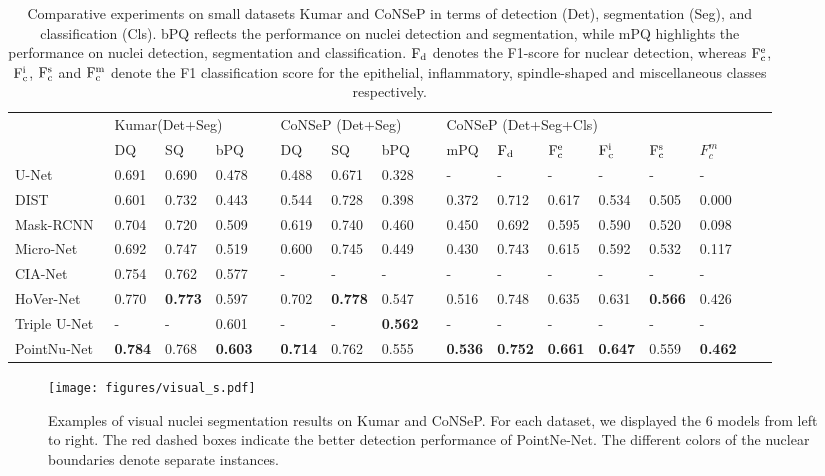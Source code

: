 \documentclass[lettersize,journal]{IEEEtran}
\begin{document}
\begin{table*}[ht]\footnotesize
\centering
\caption{Comparative experiments on small datasets Kumar and CoNSeP in terms of detection (Det), segmentation (Seg), and classification (Cls). bPQ reflects the performance on nuclei detection and segmentation, while mPQ highlights the performance on nuclei detection, segmentation and classification. $\rm{F_d}$ denotes the F1-score for nuclear detection, whereas $\rm{F_c^e}$, $\rm{F_c^i}$, $\rm{F_c^s}$ and $\rm{F_c^m}$ denote the F1 classification score for the epithelial, inflammatory, spindle-shaped and miscellaneous classes respectively.}
\begin{tabular}{lllllllllllllllll}
\toprule
   & \multicolumn{3}{l}{Kumar(Det+Seg)} &  & \multicolumn{3}{l}{CoNSeP (Det+Seg)} &  & \multicolumn{6}{l}{CoNSeP (Det+Seg+Cls)}    \\ \cmidrule{2-4} \cmidrule{6-8} \cmidrule{10-15}
   & DQ & SQ & bPQ &  &  DQ & SQ & bPQ && mPQ & $\rm{F_d}$ & $\rm{F_c^e}$ & $\rm{F_c^i}$ & $\rm{F_c^s}$ & \rm{$F_c^m$}  \\ \midrule
U-Net~\cite{unet} &0.691&0.690&0.478&&0.488&0.671&0.328& & -  &-&-&-&-&-\\
DIST~\cite{dist}  & 0.601 & 0.732 & 0.443 &  &  0.544 & 0.728 & 0.398 && 0.372  & 0.712 & 0.617 & 0.534 & 0.505 & 0.000\\
Mask-RCNN~\cite{maskrcnn}  & 0.704 & 0.720 & 0.509 &  &  0.619 & 0.740 & 0.460 &&0.450   & 0.692 & 0.595 & 0.590 & 0.520 & 0.098\\
Micro-Net~\cite{micronet}   & 0.692 & 0.747 & 0.519 &   & 0.600 & 0.745 & 0.449 && 0.430 & 0.743 & 0.615 & 0.592 & 0.532 & 0.117 \\
CIA-Net~\cite{cianet}   & 0.754 & 0.762 & 0.577 &   & - & - & -& &-   &-&-&-&-&-\\
HoVer-Net~\cite{hovernet}   & 0.770 & \textbf{0.773} & 0.597 &   & 0.702 & \textbf{0.778} & 0.547 && 0.516 & 0.748 & 0.635 & 0.631 & \textbf{0.566} & 0.426 \\
Triple U-Net~\cite{tripleunet}	 & - & - & 0.601 &  & - & - & \textbf{0.562} &&- &-&-&-&-&-\\
PointNu-Net   & \textbf{0.784} & 0.768 & \textbf{0.603} &  & \textbf{0.714} & 0.762 & 0.555 && \textbf{0.536} & \textbf{0.752} & \textbf{0.661} & \textbf{0.647} & 0.559 & \textbf{0.462} \\ \bottomrule
\end{tabular}
\label{tab:kumar}
\end{table*}


\begin{figure*}[ht] 
\centering
\texttt{[image: figures/visual\_s.pdf]}
\caption{Examples of visual nuclei segmentation results on Kumar and CoNSeP. For each dataset, we displayed the 6 models from left to right. The red dashed boxes indicate the better detection performance of PointNe-Net. The different colors of the nuclear boundaries denote separate instances. }
\label{fig:visual1}
\end{figure*}
\end{document}
